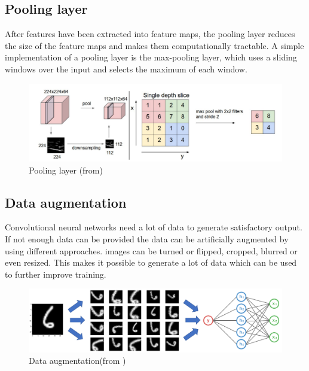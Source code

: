 \subsection{Pooling layer}
After features have been extracted into feature maps,  the pooling layer reduces the 
size of the feature maps and makes them computationally  tractable. A simple implementation 
of a pooling layer is the max-pooling layer, which uses a sliding windows over the input and 
selects the maximum of each window. 

\begin{figure}[H]
	\centering
	\includegraphics[width=\linewidth]{bilder/grundlagen/pooling.png}
	\caption{Pooling layer (from\cite{Dao})}
	\label{fig:Pooling}
\end{figure}

\subsection{Data augmentation}
Convolutional neural networks need a lot of data to generate satisfactory output. 
If not enough data can be provided the data can be artificially augmented by using different approaches.
images can be turned or flipped, cropped, blurred or even resized. This makes it 
possible to generate a lot of data which can be used to further improve training.

\begin{figure}[H]
	\centering
	\includegraphics[width=\linewidth]{bilder/deep_learning/data_aug_basic.png}
	\caption{Data augmentation(from  \cite{Ratner2017})}
	\label{fig:COMPONENT}
\end{figure}

